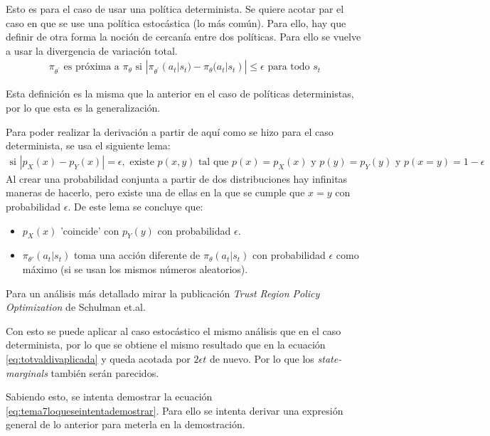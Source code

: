 Esto es para el caso de usar una política determinista. Se quiere acotar par el caso en que se
use una política estocástica (lo más común). Para ello, hay que definir de otra forma la noción
de cercanía entre dos políticas. Para ello se vuelve a usar la divergencia de variación total.
\begin{align}
\pi _ { \theta ^ { \prime } } \text { es próxima a } \pi _ { \theta } \text { si } | \pi _ {
\theta ^ { \prime } } ( a _ { t } | s _ { t } ) - \pi _ { \theta } ( a _ { t } | s _ { t } ) |
\leq \epsilon \text { para todo } s _ { t }
\end{align}

Esta definición es la misma que la anterior en el caso de políticas deterministas, por
lo que esta es la generalización.

Para poder realizar la derivación a partir de aquí como se hizo para el caso determinista, se usa
el siguiente lema:
\begin{align}
    \text{si }| p _ { X } ( x ) - p _ { Y } ( x ) | = \epsilon , \text { existe } p ( x , y )
    \text { tal que } p ( x ) = p _ { X } ( x ) \text { y } p ( y ) = p _ { Y } ( y ) \text { y }
    p ( x = y ) = 1-\epsilon
\end{align}
Al crear una probabilidad conjunta a partir de dos distribuciones hay infinitas maneras de
hacerlo, pero existe una de ellas en la que se cumple que $x=y$ con probabilidad
$\epsilon$. De este lema se concluye que:
\begin{itemize}
    \item $p_X(x)$ 'coincide' con $p_Y(y)$ con probabilidad $\epsilon$.
    \item $\pi_{\theta'}(a_t|s_t)$ toma una acción diferente de $\pi_\theta(a_t|s_t)$ 
        con probabilidad $\epsilon$ como máximo (si se usan los mismos números aleatorios).
\end{itemize}

Para un análisis más detallado mirar la publicación \textit{Trust Region Policy Optimization}
de Schulman et.al.

Con esto se puede aplicar al caso estocástico el mismo análisis que en el caso determinista,
por lo que se obtiene el mismo resultado que en la ecuación \ref{eq:totvaldivaplicada} y
queda acotada por $2\epsilon t$ de nuevo. Por lo que los \textit{state-marginals} también
serán parecidos.

Sabiendo esto, se intenta demostrar la ecuación
\ref{eq:tema7loqueseintentademostrar}. Para ello se intenta derivar una expresión general de
lo anterior para meterla en la demostración.


